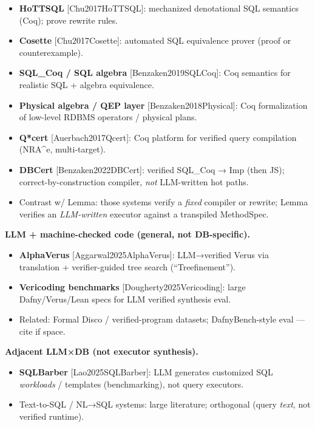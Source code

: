 \documentclass[
]{article}
\providecommand{\tightlist}{%
  \setlength{\itemsep}{0pt}\setlength{\parskip}{0pt}}
\begin{document}
\begin{itemize}
\tightlist
\item
  \textbf{HoTTSQL} {[}Chu2017HoTTSQL{]}: mechanized denotational SQL
  semantics (Coq); prove rewrite rules.
\item
  \textbf{Cosette} {[}Chu2017Cosette{]}: automated SQL equivalence
  prover (proof or counterexample).
\item
  \textbf{SQL\_Coq / SQL algebra} {[}Benzaken2019SQLCoq{]}: Coq
  semantics for realistic SQL + algebra equivalence.
\item
  \textbf{Physical algebra / QEP layer} {[}Benzaken2018Physical{]}: Coq
  formalization of low-level RDBMS operators / physical plans.
\item
  \textbf{Q*cert} {[}Auerbach2017Qcert{]}: Coq platform for verified
  query compilation (NRA\^{}e, multi-target).
\item
  \textbf{DBCert} {[}Benzaken2022DBCert{]}: verified SQL\_Coq → Imp
  (then JS); correct-by-construction compiler, \emph{not} LLM-written
  hot paths.
\item
  Contrast w/ Lemma: those systems verify a \emph{fixed} compiler or
  rewrite; Lemma verifies an \emph{LLM-written} executor against a
  transpiled MethodSpec.
\end{itemize}

\textbf{LLM + machine-checked code (general, not DB-specific).}

\begin{itemize}
\tightlist
\item
  \textbf{AlphaVerus} {[}Aggarwal2025AlphaVerus{]}: LLM→verified Verus
  via translation + verifier-guided tree search (``Treefinement'').
\item
  \textbf{Vericoding benchmarks} {[}Dougherty2025Vericoding{]}: large
  Dafny/Verus/Lean specs for LLM verified synthesis eval.
\item
  Related: Formal Disco / verified-program datasets; DafnyBench-style
  eval --- cite if space.
\end{itemize}

\textbf{Adjacent LLM×DB (not executor synthesis).}

\begin{itemize}
\tightlist
\item
  \textbf{SQLBarber} {[}Lao2025SQLBarber{]}: LLM generates customized
  SQL \emph{workloads} / templates (benchmarking), not query executors.
\item
  Text-to-SQL / NL→SQL systems: large literature; orthogonal (query
  \emph{text}, not verified runtime).
\end{itemize}
\end{document}
